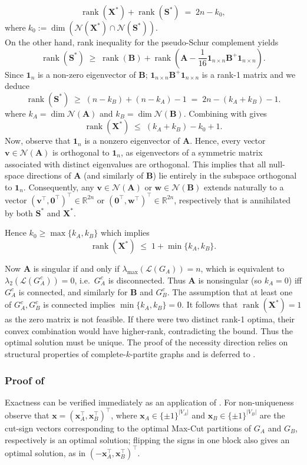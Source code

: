 \documentclass[a4paper,fleqn]{cas-sc}
\newcommand{\R}{\mathbb{R}}
\newcommand{\X}{\mathbf{X}}
\renewcommand{\L}{\mathcal{L}}
\newcommand{\1}{\mathbf{1}}
\newcommand{\A}{\mathbf{A}}
\newcommand{\x}{\mathbf{x}}
\newcommand{\B}{\mathbf{B}}
\newcommand{\bS}{\mathbf{S}}
\newcommand{\bw}{\mathbf{w}}
\newcommand{\bv}{\mathbf{v}}
\newcommand*{\myQED}{\hfill \scalebox{0.59}{\fbox{\rule{0.08mm}{0pt}\rule{0pt}{1.3mm}}}}%
\DeclareMathOperator{\rank}{rank}
\begin{document}
\begin{equation}\label{sylv}
\rank(\X^*)+\rank(\bS^*) \;=\; 2n - k_0, 
\end{equation}
$\text{where}\; k_0:= \dim \left(\mathcal{N}(\X^*) \cap \mathcal{N}(\bS^*)\right)$.\\

On the other hand, rank inequality for the pseudo-Schur complement yields
\[
\rank(\bS^*) \;\geq\; \rank(\B)+\rank \left(\A-\frac{1}{16}\1_{n \times n}\B^+\1_{n \times n}\right).
\]
Since $\1_n$ is a non-zero eigenvector of $\B$; $\1_{n \times n}\B^+\1_{n \times n}$ is a rank-1 matrix and we deduce
\[
\rank(\bS^*) \;\ge\; (n-k_B)+(n-k_A)-1 \;=\; 2n-(k_A+k_B)-1.
\]
where $k_A=\dim\mathcal{N}(\A)$ and $k_B=\dim\mathcal{N}(\B)$.
Combining with  gives
\[
\rank(\X^*) \;\le\; (k_A+k_B)-k_0+1.
\]
Now, observe that $\1_n$ is a nonzero eigenvector of $\mathbf{A}$. 
Hence, every vector $\bv \in \mathcal{N}(\mathbf{A})$ is orthogonal to $\1_n$, as eigenvectors of a symmetric matrix 
associated with distinct eigenvalues are orthogonal. This implies that all null-space directions of $\A$ (and similarly 
of $\B$) lie entirely in the subspace orthogonal to $\1_n$. Consequently, any $\bv \in \mathcal{N}(\A)$ or $\bw \in \mathcal{N}(\B)$ extends naturally to a vector 
$(\bv^{\top},\mathbf{0}^{\top})^{\top} \in \R^{2n}$ or $(\mathbf{0}^{\top},\bw^{\top})^{\top} \in \R^{2n}$, respectively that is annihilated by both $\bS^*$ and $\X^*$. 

Hence
$k_0 \ge \max\{k_A,k_B\}$ which implies
\[
\rank(\X^*) \;\leq\; 1+\min\{k_A,k_B\}.
\]

Now $\A$ is singular if and only if $\lambda_{\max}(\L(G_A))=n$, which is equivalent to $\lambda_2(\L(G_A^c))=0$, i.e.\ $G_A^c$ is disconnected. Thus $\A$ is nonsingular (so $k_A=0$)
iff $G_A^c$ is connected, and similarly for $\B$ and $G_B^c$. The assumption that at least one of $G_A^c,G_B^c$
is connected implies $\min\{k_A,k_B\}=0$. It follows that $\rank(\X^*) = 1$ as the zero matrix is not feasible. If there were two distinct rank-1 optima, their convex combination would have higher-rank, contradicting the bound. Thus the optimal  solution must be unique. The proof of the necessity direction relies on structural properties of complete-$k$-partite graphs and is deferred to .\myQED

\subsubsection{Proof of }
    Exactness can be verified immediately as an application of . For non-uniqueness observe that \( \x = (\x_A^\top, \x_B^\top)^\top \), where \( \x_A \in \{\pm 1\}^{|V_A|} \) and  $\x_B \in  \{\pm 1\}^{|V_B|}$  are the cut-sign vectors corresponding to the optimal Max-Cut partitions of \( G_A \) and \( G_B \), respectively is an optimal solution; flipping the signs in one block also gives an optimal solution, as in $(-\x_A^{\top}, \x_B^{\top})^{\top}$. \myQED
\end{document}
